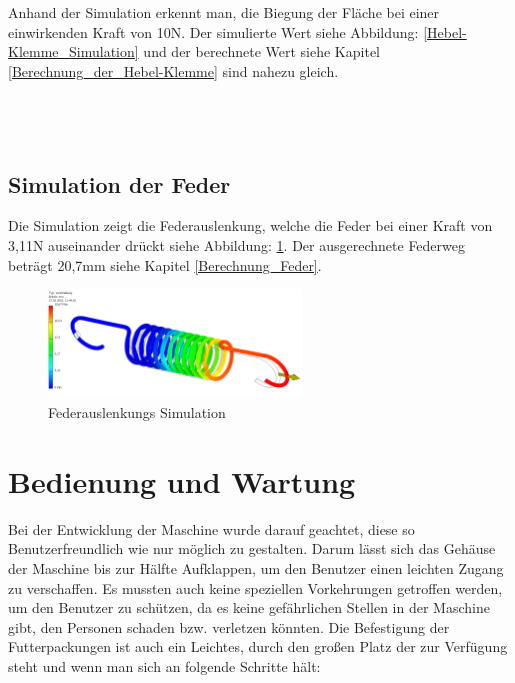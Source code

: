 Anhand der Simulation erkennt man, die Biegung der Fläche bei einer einwirkenden Kraft von 10N. Der simulierte Wert siehe Abbildung: \ref{Hebel-Klemme_Simulation} und der berechnete Wert siehe Kapitel \ref{Berechnung_der_Hebel-Klemme} sind nahezu gleich.\\
\\
\\
\\

\subsection{Simulation der Feder}
Die Simulation zeigt die Federauslenkung, welche die Feder bei einer Kraft von 3,11N auseinander drückt siehe Abbildung: \ref{Federauslenkung_Simulation_Simulation}. Der ausgerechnete Federweg beträgt 20,7mm siehe Kapitel \ref{Berechnung_Feder}. \\

\begin{figure}[H]
\begin{center}
\vspace{-20pt}
\includegraphics[width=0.6\textwidth]{Bilder/Simulation/Federauslenkung_Simulation}
  \caption{Federauslenkungs Simulation}
  \label{Federauslenkung_Simulation_Simulation}
\end{center}
\vspace{-10pt}
\end{figure}

\section{Bedienung und Wartung}

Bei der Entwicklung der Maschine wurde darauf geachtet, diese so  Benutzerfreundlich wie nur möglich zu gestalten. Darum lässt sich das Gehäuse der Maschine bis zur Hälfte Aufklappen, um den Benutzer einen leichten Zugang zu verschaffen. Es mussten auch keine speziellen Vorkehrungen getroffen werden, um den Benutzer zu schützen, da es keine gefährlichen Stellen in der Maschine gibt, den Personen schaden bzw. verletzen könnten. Die Befestigung der Futterpackungen ist auch ein Leichtes, durch den großen Platz der zur Verfügung steht und wenn man sich an folgende Schritte hält: 

